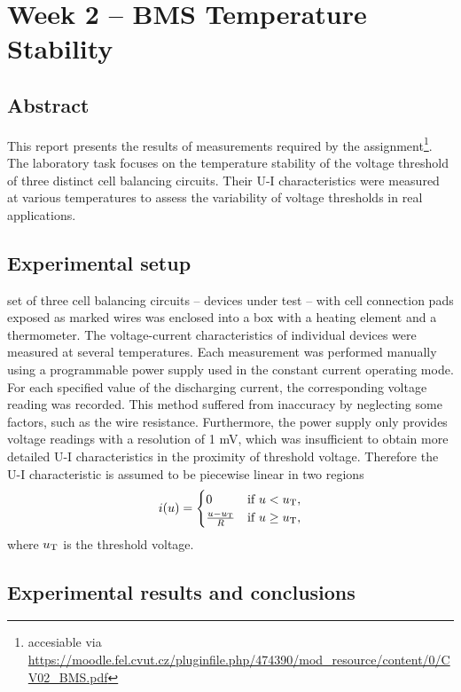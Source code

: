 
\chapter{Week 2 -- BMS Temperature Stability}
\section{Abstract}
This report presents the results of measurements required by the assignment\footnote{accesiable via \url{https://moodle.fel.cvut.cz/pluginfile.php/474390/mod_resource/content/0/CV02_BMS.pdf}}. The laboratory task focuses on the temperature stability of the voltage threshold of three distinct cell balancing circuits. Their U-I characteristics were measured at various temperatures to assess the variability of voltage thresholds in real applications.


\section{Experimental setup}

 set of three cell balancing circuits -- devices under test -- with cell connection pads exposed as marked wires was enclosed into a box with a heating element and a thermometer. The voltage-current characteristics of individual devices were measured at several temperatures. Each measurement was performed manually using a programmable power supply used in the constant current operating mode. For each specified value of the discharging current, the corresponding voltage reading was recorded. This method suffered from inaccuracy by neglecting some factors, such as the wire resistance. Furthermore, the power supply only provides voltage readings with a resolution of 1 mV, which was insufficient to obtain more detailed U-I characteristics in the proximity of threshold voltage. Therefore the U-I characteristic is assumed to be piecewise linear in two regions
\begin{equation}
    i(u) = \begin{cases}
    0 & \text{if }  u < u_{\rm{T}}, \\
    \frac{u - u_{\rm{T}}}{R} & \text{if }  u \ge u_{\rm{T}},
    \end{cases}
\end{equation}
where $u_{\rm{T}}$ is the threshold voltage.

\section{Experimental results and conclusions}




